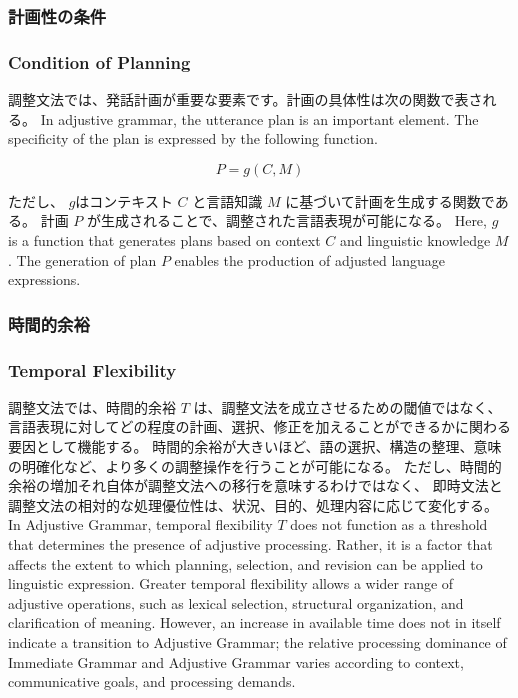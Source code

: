 \documentclass[a4paper]{article}
\begin{document}
\ifJPN
\subsubsection{計画性の条件}
\else
\subsubsection{Condition of Planning}
\fi

\ifJPN
調整文法では、発話計画が重要な要素です。計画の具体性は次の関数で表される。
\else
In adjustive grammar, the utterance plan is an important element. The specificity of the plan is expressed by the following function.
\fi

\[
P = g(C, M)
\]

\ifJPN
ただし、
\( g \)はコンテキスト \( C \) と言語知識 \( M \) に基づいて計画を生成する関数である。
計画 \( P \) が生成されることで、調整された言語表現が可能になる。
\else
Here, \( g \) is a function that generates plans based on context \( C \) and linguistic knowledge \( M \).
The generation of plan \( P \) enables the production of adjusted language expressions.
\fi

\ifJPN
\subsubsection{時間的余裕}
\else
\subsubsection{Temporal Flexibility}
\fi

\ifJPN
調整文法では、時間的余裕 \( T \) は、調整文法を成立させるための閾値ではなく、
言語表現に対してどの程度の計画、選択、修正を加えることができるかに関わる要因として機能する。
時間的余裕が大きいほど、語の選択、構造の整理、意味の明確化など、より多くの調整操作を行うことが可能になる。
ただし、時間的余裕の増加それ自体が調整文法への移行を意味するわけではなく、
即時文法と調整文法の相対的な処理優位性は、状況、目的、処理内容に応じて変化する。
\else
In Adjustive Grammar, temporal flexibility \( T \) does not function as a threshold that determines the presence of adjustive processing.
Rather, it is a factor that affects the extent to which planning, selection, and revision can be applied to linguistic expression.
Greater temporal flexibility allows a wider range of adjustive operations, such as lexical selection, structural organization, and clarification of meaning.
However, an increase in available time does not in itself indicate a transition to Adjustive Grammar; the relative processing dominance of Immediate Grammar and Adjustive Grammar varies according to context, communicative goals, and processing demands.
\fi
\ifJPN
\end{document}
